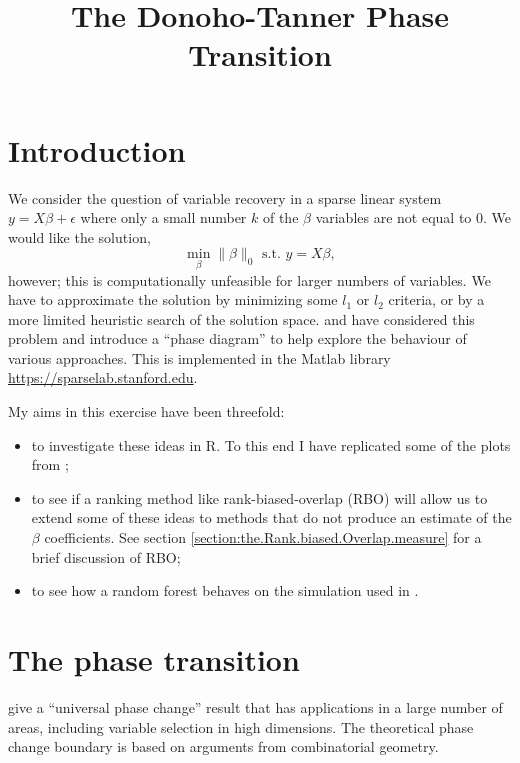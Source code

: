 \documentclass[11pt]{article}
\title{The Donoho-Tanner Phase Transition}
\author{}
\date{}
\begin{document}
\maketitle




\section{Introduction}
We consider the question of variable recovery in a sparse linear system $y=X \beta + \epsilon$ where only
a small number $k$ of the $\beta$ variables are not equal to 0. We would like the solution,
\[
\min_\beta \rVert \beta \rVert_0 \textrm{ s.t. } y = X\beta,
\]
however; this is computationally unfeasible for larger numbers of variables. We have to approximate the solution by
minimizing some $l_1$ or $l_2$ criteria, or by a more limited heuristic search of the solution space.
\cite{Donoho.and.Tanner.2009} and \cite{Donoho.and.Stodden.2006}  have considered this problem and introduce a ``phase
diagram'' to help explore the behaviour of various approaches.
This is implemented in the Matlab library \url{https://sparselab.stanford.edu}.

My aims in this exercise have been threefold:
\begin{itemize}
\item to investigate these ideas  in R. To this end I have replicated some of the plots from
  \cite{Donoho.and.Stodden.2006};
\item to see if a ranking method like rank-biased-overlap (RBO) \cite[]{Webber2010} will allow us to extend some of these
  ideas to methods that do not produce an estimate of the $\beta$ coefficients. See section \ref{section:the.Rank.biased.Overlap.measure} for a brief
  discussion of RBO;
\item to see how a random forest behaves on the simulation used in \cite{Donoho.and.Stodden.2006}.
\end{itemize}

\section{The phase transition}
\cite{Donoho.and.Tanner.2009} give a ``universal phase change'' result that has applications in a
large number of areas, including variable selection in high dimensions. The theoretical phase change boundary is based on arguments
from combinatorial geometry.
\end{document}

